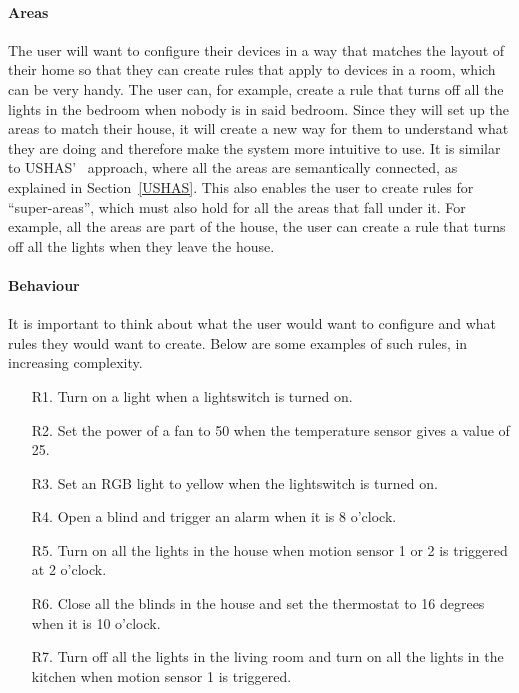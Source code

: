 \documentclass[11pt,a4paper]{report}
\begin{document}
\paragraph{Areas}
The user will want to configure their devices in a way that matches the layout of their home so that they can create rules that apply to devices in a room, which can be very handy. The user can, for example, create a rule that turns off all the lights in the bedroom when nobody is in said bedroom. Since they will set up the areas to match their house, it will create a new way for them to understand what they are doing and therefore make the system more intuitive to use. It is similar to USHAS'~\cite{SOTA_AutomationConfigurationSmarthome} approach, where all the areas are semantically connected, as explained in Section~\ref{USHAS}. This also enables the user to create rules for ``super-areas'', which must also hold for all the areas that fall under it. For example, all the areas are part of the house, the user can create a rule that turns off all the lights when they leave the house.

\paragraph{Behaviour}
\label{Behaviour}
It is important to think about what the user would want to configure and what rules they would want to create. Below are some examples of such rules, in increasing complexity.
\begin{enumerate}
    \item[R1.] Turn on a light when a lightswitch is turned on.
    \item[R2.] Set the power of a fan to 50 when the temperature sensor gives a value of 25.
    \item[R3.] Set an RGB light to yellow when the lightswitch is turned on.
    \item[R4.] Open a blind and trigger an alarm when it is 8 o'clock.
    \item[R5.] Turn on all the lights in the house when motion sensor 1 or 2 is triggered at 2 o'clock.
    \item[R6.] Close all the blinds in the house and set the thermostat to 16 degrees when it is 10 o'clock.
    \item[R7.] Turn off all the lights in the living room and turn on all the lights in the kitchen when motion sensor 1 is triggered.
\end{enumerate}
\end{document}
